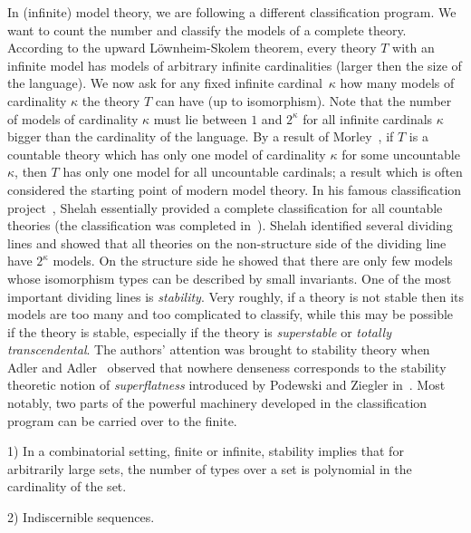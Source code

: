 \smallskip

In (infinite) model theory, we are following a different classification program. We 
want to count the number and classify the models of a complete theory. According
to the upward L\"ownheim-Skolem theorem, every theory $T$ with an infinite model has
models of arbitrary infinite cardinalities (larger then the size of the language). We 
now ask for any fixed infinite cardinal~$\kappa$ how many models of cardinality 
$\kappa$ the theory $T$ can have (up to isomorphism). Note that the number of
models of cardinality $\kappa$ must lie between $1$ and $2^\kappa$ for all infinite cardinals $\kappa$ 
bigger than the cardinality of the language. By a result of 
Morley~\cite{morley1965categoricity}, if $T$ is a countable
theory which has only one model of cardinality $\kappa$ for some uncountable $\kappa$, 
then $T$ has only one model for all uncountable cardinals; a result which 
is often considered the starting point of modern model theory. In his famous classification
project~\cite{shelah1990classification}, Shelah essentially provided a complete
classification for all countable theories (the classification was completed 
in~\cite{hart2000uncountable}). Shelah identified several dividing lines and showed that
all theories on the non-structure side of the dividing line have $2^\kappa$ models. On
the structure side he showed that there are only few models whose isomorphism 
types can be described by small invariants. One of the most important dividing 
lines is \emph{stability}. Very roughly, if a theory is not stable then its models 
are too many and too complicated to classify, while this may be possible if the theory is stable, 
especially if the theory is \emph{superstable} or \emph{totally transcendental}.
The authors' attention was brought to stability theory when Adler and 
Adler~\cite{adler2014interpreting} observed that nowhere denseness corresponds 
to the stability theoretic notion of \emph{superflatness} introduced by Podewski and 
Ziegler in~\cite{podewski1978stable}. Most notably, two
parts of the powerful machinery developed in the classification program can be 
carried over to the finite. 


1) In a combinatorial setting, finite or infinite, stability implies that for arbitrarily large sets, 
the number of types over a set is polynomial in the cardinality of the set.

2) Indiscernible sequences. 



